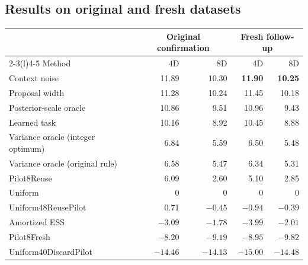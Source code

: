 \documentclass[11pt,letterpaper]{article}
\begin{document}
\subsection{Results on original and fresh datasets}
\begin{center}\small
\begin{tabular}{@{}lrrrr@{}}
\toprule
&\multicolumn{2}{c}{Original confirmation}&\multicolumn{2}{c}{Fresh follow-up}\\
\cmidrule(lr){2-3}\cmidrule(l){4-5}
Method & 4D & 8D & 4D & 8D\\
\midrule
Context noise &11.89&10.30&\textbf{11.90}&\textbf{10.25}\\
Proposal width &11.28&10.24&11.45&10.18\\
Posterior-scale oracle &10.86&9.51&10.96&9.43\\
Learned task &10.16&8.92&10.45&8.88\\
Variance oracle (integer optimum)&6.84&5.59&6.50&5.48\\
Variance oracle (original rule)&6.58&5.47&6.34&5.31\\
Pilot8Reuse&6.09&2.60&5.10&2.85\\
Uniform&0&0&0&0\\
Uniform48ReusePilot&0.71&$-0.45$&$-0.94$&$-0.39$\\
Amortized ESS&$-3.09$&$-1.78$&$-3.99$&$-2.01$\\
Pilot8Fresh&$-8.20$&$-9.19$&$-8.95$&$-9.82$\\
Uniform40DiscardPilot&$-14.46$&$-14.13$&$-15.00$&$-14.48$\\
\bottomrule
\end{tabular}
\label{tab:baselines}
\end{center}
\clearpage
\end{document}
